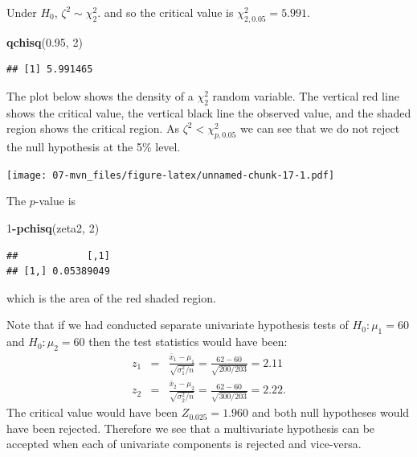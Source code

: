 \documentclass[
]{book}
\newenvironment{Shaded}{\begin{snugshade}}{\end{snugshade}}
\newcommand{\DecValTok}[1]{\textcolor[rgb]{0.00,0.00,0.81}{#1}}
\newcommand{\FloatTok}[1]{\textcolor[rgb]{0.00,0.00,0.81}{#1}}
\newcommand{\FunctionTok}[1]{\textcolor[rgb]{0.13,0.29,0.53}{\textbf{#1}}}
\newcommand{\NormalTok}[1]{#1}
\newcommand{\SpecialCharTok}[1]{\textcolor[rgb]{0.81,0.36,0.00}{\textbf{#1}}}
\theoremstyle{definition}
\theoremstyle{definition}
\theoremstyle{definition}
\theoremstyle{definition}
\theoremstyle{remark}
\begin{document}
Under \(H_0\), \(\zeta^2\sim \chi^2_2\). and so the critical value is \(\chi^2_{2,0.05} = 5.991\).

\begin{Shaded}
\begin{Highlighting}[]
\FunctionTok{qchisq}\NormalTok{(}\FloatTok{0.95}\NormalTok{, }\DecValTok{2}\NormalTok{)}
\end{Highlighting}
\end{Shaded}

\begin{verbatim}
## [1] 5.991465
\end{verbatim}

The plot below shows the density of a \(\chi^2_2\) random variable. The vertical red line shows the critical value, the vertical black line the observed value, and the shaded region shows the critical region. As \(\zeta^2 < \chi^2_{p,0.05}\) we can see that we do not reject the null hypothesis at the 5\% level.

\texttt{[image: 07-mvn\_files/figure-latex/unnamed-chunk-17-1.pdf]}

The \(p\)-value is

\begin{Shaded}
\begin{Highlighting}[]
\DecValTok{1}\SpecialCharTok{{-}}\FunctionTok{pchisq}\NormalTok{(zeta2, }\DecValTok{2}\NormalTok{)}
\end{Highlighting}
\end{Shaded}

\begin{verbatim}
##            [,1]
## [1,] 0.05389049
\end{verbatim}

which is the area of the red shaded region.

Note that if we had conducted separate univariate hypothesis tests of \(H_0: \mu_1 = 60\) and \(H_0: \mu_2 = 60\) then the test statistics would have been:
\begin{eqnarray*}
z_1 &=& \frac{\bar{x}_1 - \mu_1}{\sqrt{\sigma_1^2/n}} = \frac{62-60}{\sqrt{200/203}} = 2.11  \\
z_2 &=& \frac{\bar{x}_2 - \mu_2}{\sqrt{\sigma_2^2/n}} = \frac{62-60}{\sqrt{300/203}} = 2.22.
\end{eqnarray*}
The critical value would have been \(Z_{0.025} = 1.960\) and both null hypotheses would have been rejected. Therefore we see that a multivariate hypothesis can be accepted when each of univariate components is rejected and vice-versa.
\end{document}
